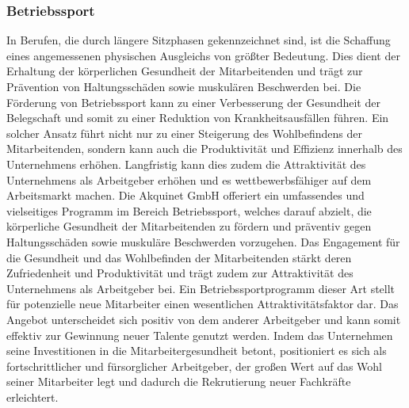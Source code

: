 \subsubsection{Betriebssport}\label{sec:betriebssport}
In Berufen, die durch längere Sitzphasen gekennzeichnet sind, ist die Schaffung eines angemessenen physischen Ausgleichs von größter Bedeutung.\cite{langesitzen} Dies dient der Erhaltung der körperlichen Gesundheit der Mitarbeitenden und trägt zur Prävention von Haltungsschäden sowie muskulären Beschwerden bei.\cite{langesitzen} Die Förderung von Betriebssport kann zu einer Verbesserung der Gesundheit der Belegschaft und somit zu einer Reduktion von Krankheitsausfällen führen.\cite{betriebssportfördertgesundheit}\newline
Ein solcher Ansatz führt nicht nur zu einer Steigerung des Wohlbefindens der Mitarbeitenden, sondern kann auch die Produktivität und Effizienz innerhalb des Unternehmens erhöhen.\newline
Langfristig kann dies zudem die Attraktivität des Unternehmens als Arbeitgeber erhöhen und es wettbewerbsfähiger auf dem Arbeitsmarkt machen.\newline \newline
Die Akquinet GmbH offeriert ein umfassendes und vielseitiges Programm im Bereich Betriebssport, welches darauf abzielt, die körperliche Gesundheit der Mitarbeitenden zu fördern und präventiv gegen Haltungsschäden sowie muskuläre Beschwerden vorzugehen. Das Engagement für die Gesundheit und das Wohlbefinden der Mitarbeitenden stärkt deren Zufriedenheit und Produktivität und trägt zudem zur Attraktivität des Unternehmens als Arbeitgeber bei.\newline
Ein Betriebssportprogramm dieser Art stellt für potenzielle neue Mitarbeiter einen wesentlichen Attraktivitätsfaktor dar. Das Angebot unterscheidet sich positiv von dem anderer Arbeitgeber und kann somit effektiv zur Gewinnung neuer Talente genutzt werden. Indem das Unternehmen seine Investitionen in die Mitarbeitergesundheit betont, positioniert es sich als fortschrittlicher und fürsorglicher Arbeitgeber, der großen Wert auf das Wohl seiner Mitarbeiter legt und dadurch die Rekrutierung neuer Fachkräfte erleichtert.

